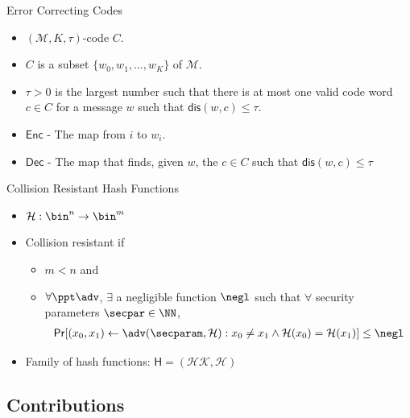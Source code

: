 \documentclass{beamer}
\newcommand{\msgspc}{\mathcal{M}}
\begin{document}
\begin{frame}{Error Correcting Codes}
	\begin{itemize}
		\setlength\itemsep{1em}
		\item $(\msgspc, K, \tau)$-code $C$.
		\item $C$ is a subset $\{w_0, w_1, \ldots, w_K \}$ of $\msgspc$.
		\item $\tau > 0$ is the largest number such that there is at most one valid code word $c \in C$ for a message $w$ such that $\mathsf{dis}(w,c) \leq \tau$.
		\item $\mathsf{Enc}$ - The map from $i$ to $w_i$.
		\item $\mathsf{Dec}$ - The map that finds, given $w$, the $c \in C$ such that $\mathsf{dis}(w,c) \leq \tau$\
		
	\end{itemize}
\end{frame}

\begin{frame}{Collision Resistant Hash Functions}
	\begin{itemize}
		\setlength\itemsep{1em}
		\item $\mathcal{H}: \bin^n \rightarrow \bin^m$
		\item Collision resistant if 
		 \begin{itemize}
        \item $m < n$ and
        \item $\forall \ppt \adv$, $\exists$ a negligible function $\negl$ such that $\forall$ security parameters $\secpar \in \NN$,
            \begin{multline*}
            \mathsf{Pr} [ ( x_0, x_1) \leftarrow \adv ( \secparam, \mathcal{H} ): 
x_0 \neq x_1 \wedge \mathcal{H} ( x_0 ) = \mathcal{H}(x_1) ] \leq \negl
            \end{multline*}
    \end{itemize}
        \item Family of hash functions: $\mathsf{H} = ( \mathcal{HK, H} )$
	\end{itemize}
\end{frame}

\subsection{Contributions}
\end{document}
